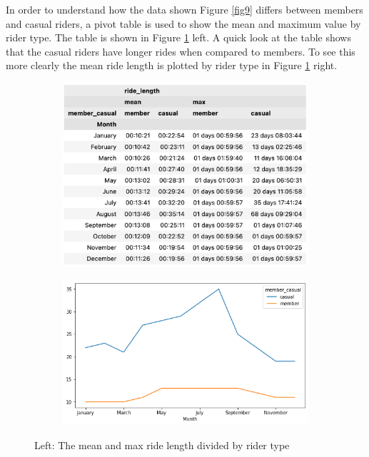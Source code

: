 \documentclass[12pt]{article}
\begin{document}
\begin{itemize}
	In order to understand how the data shown Figure \ref{fig9} differs between members and casual riders, a pivot table is used to show the mean and maximum value by rider type. The table is shown in Figure \ref{fig11} left. A quick look at the table shows that the casual riders have longer rides when compared to members. To see this more clearly the mean ride length is plotted by rider type in Figure \ref{fig11} right.
	
	
	\begin{figure}[h]
	\centering
	\begin{subfigure}{.4\textwidth}
	\hspace{-0.8 in}
		\includegraphics[scale=0.5]{imgMeanMax2.png} 
	\end{subfigure}
	\begin{subfigure}{.4\textwidth}
	\hspace{0.3 in}
		\includegraphics[scale=0.5]{mean_cvsm1.png}
	\end{subfigure}
	\caption{Left: The mean and max ride length divided by rider type}
	\label{fig11}
	\end{figure}
	
\end{itemize}
\end{document}

